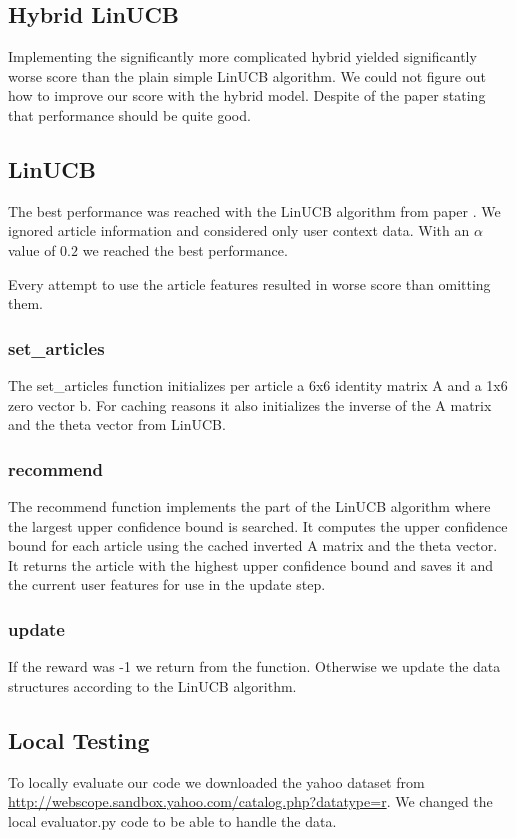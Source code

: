 \documentclass[a4paper, 11pt]{article}
\begin{document}
\subsection{Hybrid LinUCB}
Implementing the significantly more complicated hybrid yielded significantly worse score than the plain simple LinUCB algorithm. We could not figure out how to improve our score with the hybrid model. Despite of the paper stating that performance should be quite good.

\subsection{LinUCB}
The best performance was reached with the LinUCB algorithm from paper \cite{li2010contextual}. We ignored article information and considered only user context data. With an $\alpha$ value of $0.2$ we reached the best performance. 

Every attempt to use the article features resulted in worse score than omitting them.

\subsubsection{set\_articles}
The set\_articles function initializes per article a 6x6 identity matrix A and a 1x6 zero vector b. For caching reasons it also initializes the inverse of the A matrix and the theta vector from LinUCB.

\subsubsection{recommend}
The recommend function implements the part of the LinUCB algorithm where the largest upper confidence bound is searched. It computes the upper confidence bound for each article using the cached inverted A matrix and the theta vector.
It returns the article with the highest upper confidence bound and saves it and the current user features for use in the update step.

\subsubsection{update}
If the reward was -1 we return from the function. Otherwise we update the data structures according to the LinUCB algorithm.

\subsection{Local Testing}
To locally evaluate our code we downloaded the yahoo dataset from \url{http://webscope.sandbox.yahoo.com/catalog.php?datatype=r}. We changed the local evaluator.py code to be able to handle the data.




\end{document}
